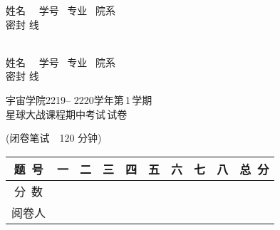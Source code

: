 \documentclass[twocolumn,landscape,UTF8]{article}
\newcommand{\putzdx}{\marginpar{\parbox{2cm}{\rotatebox[origin=c]{90}{\usebox{\zdx}}}}}%
\begin{document}
 

\sbox{\zdx}
{\parbox{26cm}{\centering\vspace{7mm}
	姓名~\underline{\makebox[44mm][c]{}}~ 学号\underline{\makebox[44mm][c]{}}~ 专业\underline{\makebox[44mm][c]{}}~ 院系\underline{\makebox[44mm][c]{}} ~\\
\dotfill{} 密\dotfill{}封 \dotfill{}线{\dotfill}}}
	\sbox{\zdxr}
{\parbox{26cm}{~\\\centering\vspace{-4mm}
	姓名~\underline{\makebox[44mm][c]{}}~ 学号\underline{\makebox[44mm][c]{}}~ 专业\underline{\makebox[44mm][c]{}}~ 院系\underline{\makebox[44mm][c]{}} ~\\
	\vspace{2mm}
\dotfill{} 密\dotfill{}封 \dotfill{}线{\dotfill}}}
\begin{spacing}{1.25}
	\begin{center}
\begin{LARGE}
宇宙学院{2219-- 2220}学年第\,{1}\,学期\\
{星球大战课程期中考试}\,试卷\\
\end{LARGE}
(闭卷笔试\ \ 120 分钟)\\
	\vspace{0.5cm}
	\setlength{\tabcolsep}{6mm}
	\renewcommand\arraystretch{1.7} 
\begin{tabular}{|c|c|c|c|c|c|c|c|c|c|}
	\hline
   题~号 &一 &二 &三 &四 &五 &六 &七 &八 & 总~分   \\
	\hline
   分~数 &   &  &  &   &  &  &  &  & \\
	 \hline
  阅卷人 &   &  &  &   &  &  &  &  &  \\
  \hline
\end{tabular}
\end{center}
\end{spacing}
\vspace{-0.5cm}
\setlength{\marginparsep}{1.5cm}

\putzdx %
\vspace{6mm}
\end{document}
